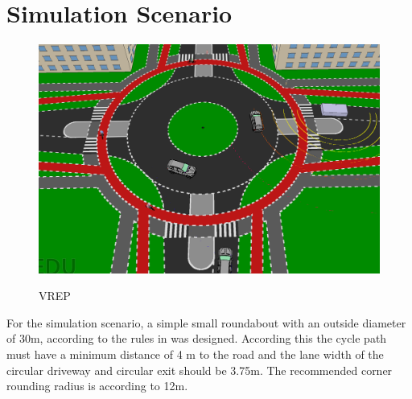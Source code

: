 \documentclass[11pt,oneside,openright]{mpreport}
\begin{document}
\section{Simulation Scenario}


\begin{figure}[!ht]
\caption{VREP}
\includegraphics[width=\textwidth]{bilder/scenario.png}
\label{vrep}
\end{figure}





For the simulation scenario, a simple small roundabout with an outside diameter of 30m, according to the rules in \cite{man06} was designed. According this the cycle path must have a minimum distance of 4 m to the road and
the lane width of the circular driveway and circular exit should be 3.75m. The recommended corner rounding radius is according to \cite{man06} 12m.
\end{document}
